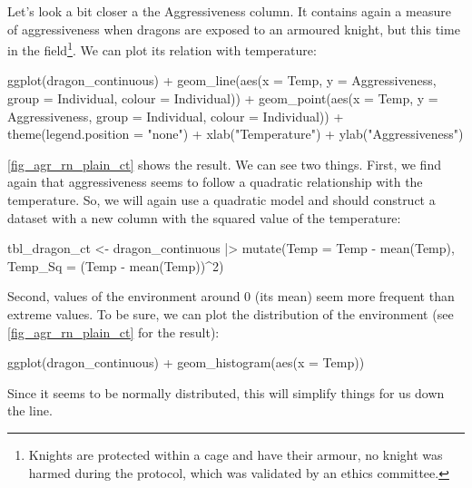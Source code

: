 \documentclass[a4paper,12pt,twoside]{article}
\begin{document}
Let's look a bit closer a the Aggressiveness column. It contains again a measure of aggressiveness when dragons are exposed to an armoured knight, but this time in the field\footnote{Knights are protected within a cage and have their armour, no knight was harmed during the protocol, which was validated by an ethics committee.}. We can plot its relation with temperature:
\begin{Rinput}
ggplot(dragon_continuous) +
    geom_line(aes(x = Temp, y = Aggressiveness, group = Individual, colour = Individual)) +
    geom_point(aes(x = Temp, y = Aggressiveness, group = Individual, colour = Individual)) +
    theme(legend.position = "none") +
    xlab("Temperature") + ylab("Aggressiveness")
\end{Rinput}
\autoref{fig_agr_rn_plain_ct} shows the result. We can see two things. First, we find again that aggressiveness seems to follow a quadratic relationship with the temperature. So, we will again use a quadratic model and should construct a dataset with a new column with the squared value of the temperature:
\begin{Rinput}
tbl_dragon_ct <-
    dragon_continuous |>
    mutate(Temp    = Temp - mean(Temp),
           Temp_Sq = (Temp - mean(Temp))^2)
\end{Rinput}
Second, values of the environment around 0 (its mean) seem more frequent than extreme values. To be sure, we can plot the distribution of the environment (see \autoref{fig_agr_rn_plain_ct} for the result):
\begin{Rinput}
 ggplot(dragon_continuous) +
    geom_histogram(aes(x = Temp))
\end{Rinput}
Since it seems to be normally distributed, this will simplify things for us down the line.
\end{document}
